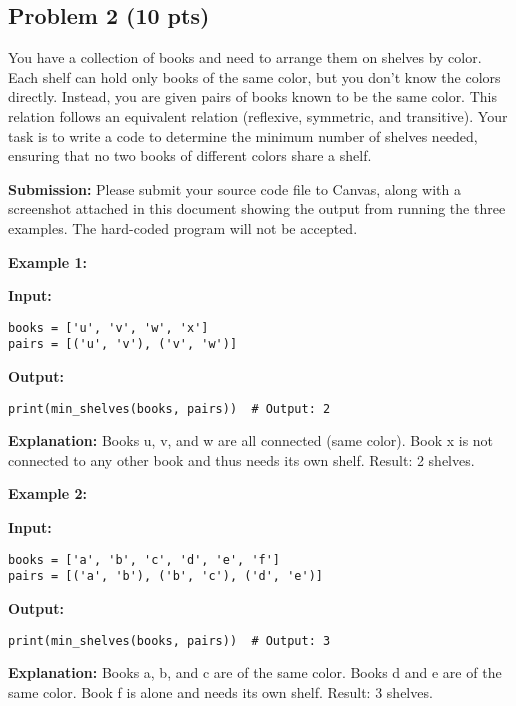 \documentclass[12pt]{article}
\begin{document}
\subsection*{Problem 2 (10 pts)}
You have a collection of books and need to arrange them on shelves by color. Each shelf can hold only books of the same color, but you don't know the colors directly. Instead, you are given pairs of books known to be the same color. This relation follows an equivalent relation (reflexive, symmetric, and transitive). Your task is to write a code to determine the minimum number of shelves needed, ensuring that no two books of different colors share a shelf.

\noindent \textbf{Submission:} Please submit your source code file to Canvas, along with a screenshot attached in this document showing the output from running the three examples. The hard-coded program will not be accepted.
\vspace{1em}  %

\noindent \textbf{Example 1:}

\noindent \textbf{Input:}
\begin{verbatim}
books = ['u', 'v', 'w', 'x']
pairs = [('u', 'v'), ('v', 'w')]
\end{verbatim}

\noindent \textbf{Output:}
\begin{verbatim}
print(min_shelves(books, pairs))  # Output: 2
\end{verbatim}

\noindent \textbf{Explanation:} Books u, v, and w are all connected (same color). Book x is not connected to any other book and thus needs its own shelf.  
Result: 2 shelves.
\vspace{1em}  %

\noindent \textbf{Example 2:}

\noindent \textbf{Input:}
\begin{verbatim}
books = ['a', 'b', 'c', 'd', 'e', 'f']
pairs = [('a', 'b'), ('b', 'c'), ('d', 'e')]
\end{verbatim}

\noindent \textbf{Output:}
\begin{verbatim}
print(min_shelves(books, pairs))  # Output: 3
\end{verbatim}

\noindent \textbf{Explanation:} Books a, b, and c are of the same color. Books d and e are of the same color. Book f is alone and needs its own shelf.  
Result: 3 shelves.
\end{document}
